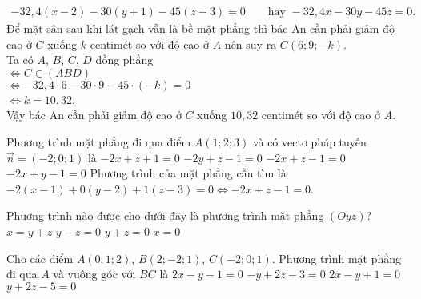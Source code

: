 \begin{vd}
{\begin{eqnarray*}
			-32{,}4 (x-2)-30(y+1)-45(z-3)=0 \qquad \text{hay } -32{,}4 x -30y -45z=0.
		\end{eqnarray*}
		Để mặt sân sau khi lát gạch vẫn là bề mặt phẳng thì bác An cần phải giảm độ cao ở $C$ xuống $k$ centimét so với độ cao ở $A$ nên suy ra $C(6; 9 ; -k)$.\\
		Ta có $A$, $B$, $C$, $D$ đồng phẳng\\
		$\Leftrightarrow C \in (ABD)$\\
		$\Leftrightarrow -32{,}4\cdot 6 -30 \cdot 9 -45\cdot (-k)=0$\\
		$\Leftrightarrow k=10{,}32$.\\
		Vậy bác An cần phải giảm độ cao ở $C$ xuống $10{,}32$ centimét so với độ cao ở $A$.
	}
\end{vd}
\baitaptn
\setcounter{ex}{0}
\begin{ex}%
	Phương trình mặt phẳng đi qua điểm $A(1;2;3)$ và có vectơ pháp tuyến $\overrightarrow{n}=(-2;0;1)$ là
	\choice
	{$-2x+z+1=0$}
	{$-2y+z-1=0$}
	{\True $-2x+z-1=0$}
	{$-2x+y-1=0$}
	\loigiai
	{
		Phương trình của mặt phẳng cần tìm là $-2(x-1)+0(y-2)+1(z-3)=0 \Leftrightarrow -2x+z-1=0$.
	}
\end{ex}

\begin{ex}%
	Phương trình nào được cho dưới đây là phương trình mặt phẳng $(Oyz)$?
	\choice
	{$x=y+z$}
	{$y-z=0$}
	{$y+z=0$}
	{\True $x=0$}
\end{ex}

\begin{ex}%
	Cho các điểm $A(0;1;2)$, $B(2;- 2;1)$, $C(- 2;0;1)$. Phương trình mặt phẳng đi qua $A$ và vuông góc với $BC$ là
	\choice
	{$2x - y - 1 = 0$}
	{$ - y + 2z - 3 = 0$}
	{\True $2x - y + 1 = 0$}
	{$y + 2z - 5 = 0$}
\end{ex}

